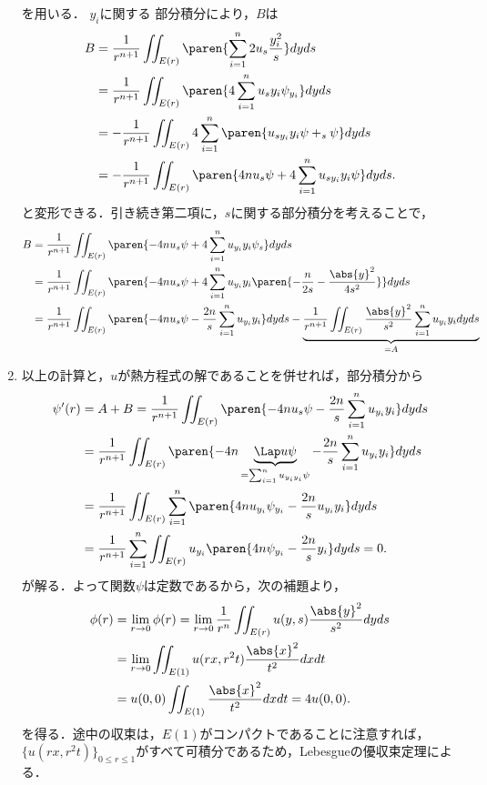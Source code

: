 \documentclass[uplatex,dvipdfmx]{jsreport}
\begin{document}
\begin{Proof}
\begin{enumerate}[{Step}1]
        を用いる．
        $y_i$に関する
        部分積分により，$B$は
        \begin{align*}
            B&=\frac{1}{r^{n+1}}\iint_{E(r)}\paren{\sum_{i=1}^n2u_s\frac{y_i^2}{s}}dyds\\
            &=\frac{1}{r^{n+1}}\iint_{E(r)}\paren{4\sum_{i=1}^nu_sy_i\psi_{y_i}}dyds\\
            &=-\frac{1}{r^{n+1}}\iint_{E(r)}4\sum_{i=1}^n\paren{u_{sy_i}y_i\psi+_s\psi}dyds\\
            &=-\frac{1}{r^{n+1}}\iint_{E(r)}\paren{4nu_s\psi+4\sum_{i=1}^nu_{sy_i}y_i\psi}dyds.
        \end{align*}
        と変形できる．引き続き第二項に，$s$に関する部分積分を考えることで，
        \begin{align*}
            B&=\frac{1}{r^{n+1}}\iint_{E(r)}\paren{-4nu_s\psi+4\sum_{i=1}^nu_{y_i}y_i\psi_s}dyds\\
            &=\frac{1}{r^{n+1}}\iint_{E(r)}\paren{-4nu_s\psi+4\sum_{i=1}^nu_{y_i}y_i\paren{-\frac{n}{2s}-\frac{\abs{y}^2}{4s^2}}}dyds\\
            &=\frac{1}{r^{n+1}}\iint_{E(r)}\paren{-4nu_s\psi-\frac{2n}{s}\sum_{i=1}^nu_{y_i}y_i}dyds-\underbrace{\frac{1}{r^{n+1}}\iint_{E(r)}\frac{\abs{y}^2}{s^2}\sum_{i=1}^nu_{y_i}y_idyds}_{=A}
        \end{align*}
        \item 以上の計算と，$u$が熱方程式の解であることを併せれば，部分積分から
        \begin{align*}
            \psi'(r)&=A+B=\frac{1}{r^{n+1}}\iint_{E(r)}\paren{-4nu_s\psi-\frac{2n}{s}\sum_{i=1}^nu_{y_i}y_i}dyds\\
            &=\frac{1}{r^{n+1}}\iint_{E(r)}\paren{-4n\underbrace{\Lap u\psi}_{=\sum_{i=1}^nu_{y_iy_i}\psi}-\frac{2n}{s}\sum_{i=1}^nu_{y_i}y_i}dyds\\
            &=\frac{1}{r^{n+1}}\iint_{E(r)}\sum_{i=1}^n\paren{4nu_{y_i}\psi_{y_i}-\frac{2n}{s}u_{y_i}y_i}dyds\\
            &=\frac{1}{r^{n+1}}\sum_{i=1}^n\iint_{E(r)}u_{y_i}\paren{4n\psi_{y_i}-\frac{2n}{s}y_i}dyds=0.
        \end{align*}
        が解る．よって関数$\psi$は定数であるから，次の補題より，
        \begin{align*}
            \phi(r)&=\lim_{r\to0}\phi(r)=\lim_{r\to0}\frac{1}{r^n}\iint_{E(r)}u(y,s)\frac{\abs{y}^2}{s^2}dyds\\
            &=\lim_{r\to0}\iint_{E(1)}u(rx,r^2t)\frac{\abs{x}^2}{t^2}dxdt\\
            &=u(0,0)\iint_{E(1)}\frac{\abs{x}^2}{t^2}dxdt=4u(0,0).
        \end{align*}
        を得る．途中の収束は，$E(1)$がコンパクトであることに注意すれば，
        $\{u(rx,r^2t)\}_{0\le r\le 1}$がすべて可積分であるため，Lebesgueの優収束定理による．
    \end{enumerate}
\end{Proof}
\end{document}
